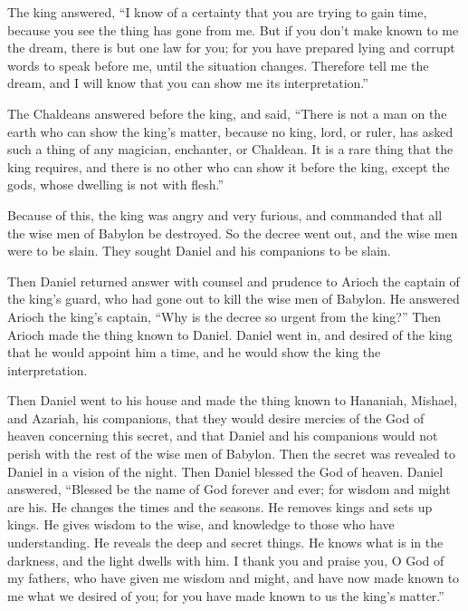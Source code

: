  The king answered, ``I know of a certainty that you are
trying to gain time, because you see the thing has gone from me.
 But if you don't make known to me the dream, there is but
one law for you; for you have prepared lying and corrupt words to speak
before me, until the situation changes. Therefore tell me the dream, and
I will know that you can show me its interpretation.''

 The Chaldeans answered before the king, and said, ``There
is not a man on the earth who can show the king's matter, because no
king, lord, or ruler, has asked such a thing of any magician, enchanter,
or Chaldean.  It is a rare thing that the king requires,
and there is no other who can show it before the king, except the gods,
whose dwelling is not with flesh.''

 Because of this, the king was angry and very furious, and
commanded that all the wise men of Babylon be destroyed. 
So the decree went out, and the wise men were to be slain. They sought
Daniel and his companions to be slain.

 Then Daniel returned answer with counsel and prudence to
Arioch the captain of the king's guard, who had gone out to kill the
wise men of Babylon.  He answered Arioch the king's
captain, ``Why is the decree so urgent from the king?'' Then Arioch made
the thing known to Daniel.  Daniel went in, and desired of
the king that he would appoint him a time, and he would show the king
the interpretation.

 Then Daniel went to his house and made the thing known to
Hananiah, Mishael, and Azariah, his companions,  that they
would desire mercies of the God of heaven concerning this secret, and
that Daniel and his companions would not perish with the rest of the
wise men of Babylon.  Then the secret was revealed to
Daniel in a vision of the night. Then Daniel blessed the God of heaven.
 Daniel answered, ``Blessed be the name of God forever and
ever; for wisdom and might are his.  He changes the times
and the seasons. He removes kings and sets up kings. He gives wisdom to
the wise, and knowledge to those who have understanding. 
He reveals the deep and secret things. He knows what is in the darkness,
and the light dwells with him.  I thank you and praise you,
O God of my fathers, who have given me wisdom and might, and have now
made known to me what we desired of you; for you have made known to us
the king's matter.''

